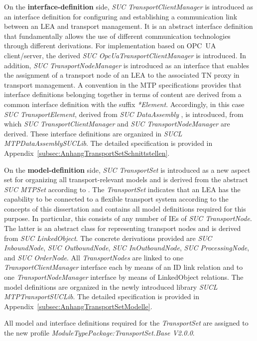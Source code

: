 On the \textbf{interface-definition} side, \emph{SUC TransportClientManager} is introduced as an interface definition for configuring and establishing a communication link between an LEA and transport management. It is an abstract interface definition that fundamentally allows the use of different communication technologies through different derivations. For implementation based on OPC~UA client/server, the derived \emph{SUC OpcUaTransportClientManager} is introduced. In addition, \emph{SUC TransportNodeManager} is introduced as an interface that enables the assignment of a transport node of an LEA to the associated TN proxy in transport management. A convention in the MTP specifications provides that interface definitions belonging together in terms of content are derived from a common interface definition with the suffix \emph{*Element}. Accordingly, in this case \emph{SUC TransportElement}, derived from \emph{SUC DataAssembly} \cite{PNO.2025.Part3}, is introduced, from which \emph{SUC TransportClientManager} and \emph{SUC TransportNodeManager} are derived. These interface definitions are organized in \emph{SUCL MTPDataAssemblySUCLib}. The detailed specification is provided in Appendix~\ref{subsec:AnhangTransportSetSchnittstellen}. 

On the \textbf{model-definition} side, \emph{SUC TransportSet} is introduced as a new aspect set for organizing all transport-relevant models and is derived from the abstract \emph{SUC MTPSet} according to \cite{PNO.2025.Part1}. The \emph{TransportSet} indicates that an LEA has the capability to be connected to a flexible transport system according to the concepts of this dissertation and contains all model definitions required for this purpose. In particular, this consists of any number of IEs of \emph{SUC TransportNode}. The latter is an abstract class for representing transport nodes and is derived from \emph{SUC LinkedObject}. The concrete derivations provided are \emph{SUC InboundNode}, \emph{SUC OutboundNode}, \emph{SUC InOutboundNode}, \emph{SUC ProcessingNode}, and \emph{SUC OrderNode}. All \emph{TransportNodes} are linked to one \emph{TransportClientManager} interface each by means of an ID link relation and to one \emph{TransportNodeManager} interface by means of LinkedObject relations. The model definitions are organized in the newly introduced library \emph{SUCL MTPTransportSUCLib}. The detailed specification is provided in Appendix~\ref{subsec:AnhangTransportSetModelle}. 

All model and interface definitions required for the \emph{TransportSet} are assigned to the new profile \emph{ModuleTypePackage:TransportSet.Base V2.0.0}.
 
